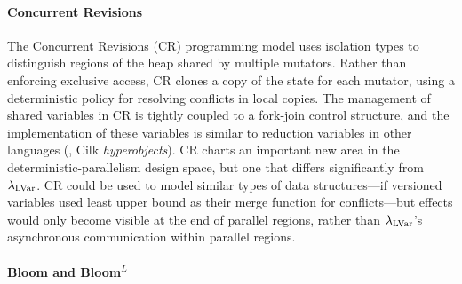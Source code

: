 \paragraph{Concurrent Revisions}
The Concurrent Revisions (CR) 
\cite{concurrent-revisions-haskell11}
programming model uses isolation types to distinguish regions of the heap shared
by multiple mutators.  Rather than enforcing exclusive access, CR
clones a copy of the state for each mutator, using a
deterministic policy for resolving conflicts in local copies.
%
The management of shared variables in CR is tightly coupled to a
fork-join control structure, and the implementation of these variables
is similar to reduction variables in other languages (\eg, Cilk
{\em hyperobjects}).
%
CR charts an important new area in the deterministic-parallelism
design space, but one that differs significantly from
$\textup{\ensuremath{\lambda_{\textrm{LVar}}}}$.  CR could be used to model similar types of data
structures---if versioned variables used least upper bound as their merge function
for conflicts---but effects would only become visible at the end of
parallel regions, rather than $\textup{\ensuremath{\lambda_{\textrm{LVar}}}}$'s asynchronous communication within
parallel regions.



\paragraph{Bloom and Bloom$^L$}

